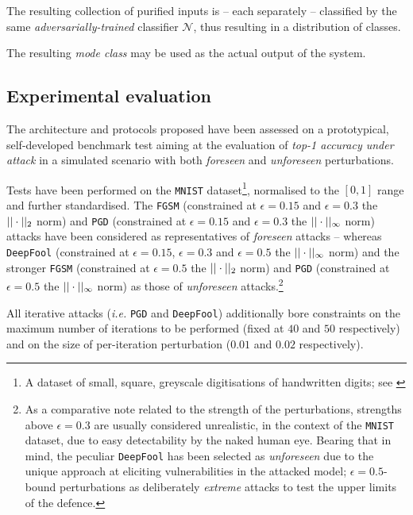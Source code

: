 The resulting collection of purified inputs is -- each separately -- classified by the same \textit{adversarially-trained} classifier $\mathcal{N}$, thus resulting in a distribution of classes.

The resulting \textit{mode class} may be used as the actual output of the system.

\subsection{Experimental evaluation}

The architecture and protocols proposed have been assessed on a prototypical, self-developed benchmark test aiming at the evaluation of \textit{top-1 accuracy under attack} in a simulated scenario with both \textit{foreseen} and \textit{unforeseen} perturbations.

Tests have been performed on the \texttt{MNIST} dataset\footnote{A dataset of small, square, greyscale digitisations of handwritten digits; see \cite{LeCunCortes2005MNIST}}, normalised to the $[0,1]$ range and further standardised. The \texttt{FGSM} (constrained at $\epsilon=0.15$ and $\epsilon=0.3$ \wrt the $||\cdot||_2$ norm) and \texttt{PGD} (constrained at $\epsilon=0.15$ and $\epsilon=0.3$ \wrt the $||\cdot||_{\infty}$ norm) attacks have been considered as representatives of \textit{foreseen} attacks -- whereas \texttt{DeepFool} (constrained at $\epsilon=0.15$, $\epsilon=0.3$ and $\epsilon=0.5$ \wrt the $||\cdot||_{\infty}$ norm) and the stronger \texttt{FGSM} (constrained at $\epsilon=0.5$ \wrt the $||\cdot||_2$ norm) and \texttt{PGD} (constrained at $\epsilon=0.5$ \wrt the $||\cdot||_{\infty}$ norm) as those of \textit{unforeseen} attacks.\footnote{As a comparative note related to the strength of the perturbations, strengths above $\epsilon=0.3$ are usually considered unrealistic, in the context of the \texttt{MNIST} dataset, due to easy detectability by the naked human eye. Bearing that in mind, the peculiar \texttt{DeepFool} has been selected as \textit{unforeseen} due to the unique approach at eliciting vulnerabilities in the attacked model; $\epsilon=0.5$-bound perturbations as deliberately \textit{extreme} attacks to test the upper limits of the defence.}

All iterative attacks (\textit{i.e.} \texttt{PGD} and \texttt{DeepFool}) additionally bore constraints on the maximum number of iterations to be performed (fixed at $40$ and $50$ respectively) and on the size of per-iteration perturbation ($0.01$ and $0.02$ respectively).

